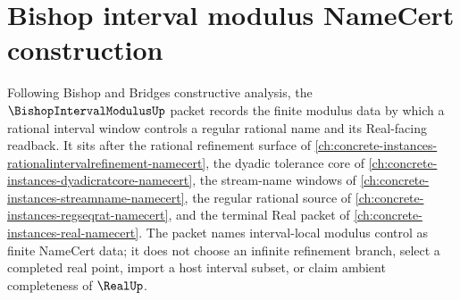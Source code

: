 \chapter{Bishop interval modulus NameCert construction}
\label{ch:concrete-instances-bishop-interval-modulus-namecert}

Following Bishop and Bridges constructive analysis, the $\BishopIntervalModulusUp$ packet records the finite modulus data by which a rational interval window controls a regular rational name and its Real-facing readback. It sits after the rational refinement surface of \autoref{ch:concrete-instances-rationalintervalrefinement-namecert}, the dyadic tolerance core of \autoref{ch:concrete-instances-dyadicratcore-namecert}, the stream-name windows of \autoref{ch:concrete-instances-streamname-namecert}, the regular rational source of \autoref{ch:concrete-instances-regseqrat-namecert}, and the terminal Real packet of \autoref{ch:concrete-instances-real-namecert}. The packet names interval-local modulus control as finite NameCert data; it does not choose an infinite refinement branch, select a completed real point, import a host interval subset, or claim ambient completeness of $\RealUp$.

